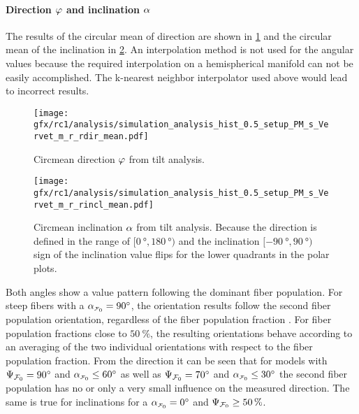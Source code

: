 \paragraph{Direction $\textnormal{$\varphi$}$ and inclination $\textnormal{$\alpha$}$}
%
The results of the circular mean of direction are shown in \cref{fig:sim_ana_dir} and the circular mean of the inclination in \cref{fig:sim_ana_incl}.
An interpolation method is not used for the angular values because the required interpolation on a hemispherical manifold can not be easily accomplished.
The k-nearest neighbor interpolator used above would lead to incorrect results.
\par
%
\begin{figure}[!p]
    \centering
    \texttt{[image: gfx/rc1/analysis/simulation\_analysis\_hist\_0.5\_setup\_PM\_s\_Vervet\_m\_r\_rdir\_mean.pdf]}
    \caption[]{Circmean direction $\textnormal{$\varphi$}$ from tilt analysis.}
    \label{fig:sim_ana_dir}
\end{figure}
%
\begin{figure}[!p]
    \centering
    \texttt{[image: gfx/rc1/analysis/simulation\_analysis\_hist\_0.5\_setup\_PM\_s\_Vervet\_m\_r\_rincl\_mean.pdf]}
    \caption[]{Circmean inclination $\textnormal{$\alpha$}$ from tilt analysis. Because the direction is defined in the range of $[\SI{0}{\degree},\SI{180}{\degree})$ and the inclination $[\SI{-90}{\degree},\SI{90}{\degree})$ sign of the inclination value flips for the lower quadrants in the polar plots.}
    \label{fig:sim_ana_incl}
\end{figure}
%
Both angles show a value pattern following the dominant fiber population.
For steep fibers with a $\modelInc = \SI{90}{\degree}$, the orientation results follow the second fiber population orientation, regardless of the fiber population fraction \modelPsi{}.
For fiber population fractions close to $\SI{50}{\percent}$, the resulting orientations behave according to an averaging of the two individual orientations with respect to the fiber population fraction.
From the direction it can be seen that for models with $\textnormal{$\Psi_{\textnormal{$\mathcal{F}_0$}}$} = \SI{90}{\degree}$ and $\modelInc \leq \SI{60}{\degree}$ as well as $\textnormal{$\Psi_{\textnormal{$\mathcal{F}_0$}}$} = \SI{70}{\degree}$ and $\modelInc \leq \SI{30}{\degree}$ the second fiber population has no or only a very small influence on the measured direction.
The same is true for inclinations for a $\modelInc = \SI{0}{\degree}$ and $\textnormal{$\Psi_{\textnormal{$\mathcal{F}_0$}}$} \geq \SI{50}{\percent}$.
%
%
%

